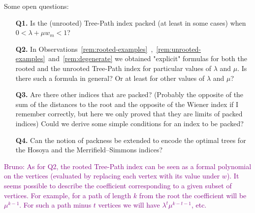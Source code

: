 \documentclass[11 pt]{modarticle}
\newcommand{\wmap}{w}
\newcommand{\wmin}{w_m}
\newcommand{\bldcomment}[1]{\textcolor{purple}{{\footnotesize Bruno:} #1}}
\begin{document}
Some open questions:
\begin{itemize}
\item[\textbf{Q1.}] Is the (unrooted) Tree-Path index packed (at least in some cases) when $0 < \lambda + \mu \wmin < 1$?
\item[\textbf{Q2.}] In Observations~\ref{rem:rooted-examples}~,~\ref{rem:unrooted-examples}~and~\ref{rem:degenerate} we obtained "explicit" formulas for both the rooted and the unrooted Tree-Path index for particular values of $\lambda$ and $\mu$. Is there such a formula in general? Or at least for other values of $\lambda$ and $\mu$?
\item[\textbf{Q3.}] Are there other indices that are packed? (Probably the opposite of the sum of the distances to the root and the opposite of the Wiener index if I remember correctly, but here we only proved that they are limits of packed indices) Could we derive some simple conditions for an index to be packed?
\item[\textbf{Q4.}] Can the notion of packness be extended to encode the optimal trees for the Hosoya and the Merrifield–Simmons\cite{andriantiana} indices?
\end{itemize}

\bldcomment{As for Q2, the rooted Tree-Path index can be seen as a formal polynomial on the vertices (evaluated by replacing each vertex with its value under $\wmap$). It seems possible to describe the coefficient corresponding to a given subset of vertices. For example, for a path of length $k$ from the root the coefficient will be $\mu^{k-1}$. For such a path minus $t$ vertices we will have $\lambda^t\mu^{k-t-1}$, etc.}

\pagebreak
{}





\pagebreak
\appendix
\end{document}
